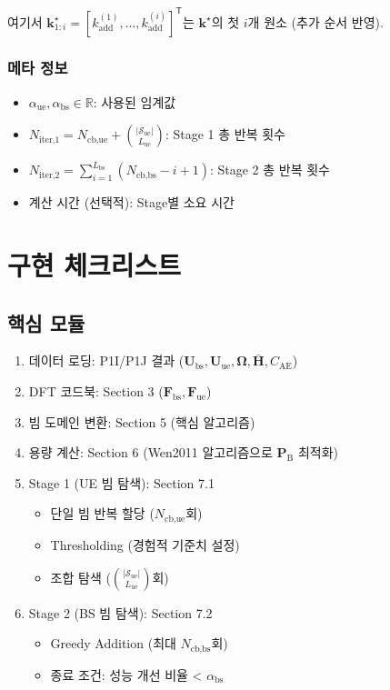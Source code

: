 \documentclass[10pt]{article}
\begin{document}
여기서 $\boldsymbol{k}^{\star}_{1:i} = [k_{\text{add}}^{(1)}, \ldots, k_{\text{add}}^{(i)}]^{\mathsf{T}}$는 $\boldsymbol{k}^{\star}$의 첫 $i$개 원소 (추가 순서 반영).

\subsubsection{메타 정보}
\begin{itemize}
    \item $\alpha_{\text{ue}}, \alpha_{\text{bs}} \in \mathbb{R}$: 사용된 임계값
    \item $N_{\text{iter,1}} = N_{\text{cb,ue}} + \binom{|\mathcal{S}_{\text{ue}}|}{L_{\text{ue}}}$: Stage 1 총 반복 횟수
    \item $N_{\text{iter,2}} = \sum_{i=1}^{L_{\text{bs}}} (N_{\text{cb,bs}} - i + 1)$: Stage 2 총 반복 횟수
    \item 계산 시간 (선택적): Stage별 소요 시간
\end{itemize}


\newpage
\section{구현 체크리스트}

\subsection{핵심 모듈}
\begin{enumerate}
    \item 데이터 로딩: P1I/P1J 결과 ($\mathbf{U}_{\text{bs}}, \mathbf{U}_{\text{ue}}, \boldsymbol{\Omega}, \bar{\mathbf{H}}, C_{\text{AE}}$)
    \item DFT 코드북: Section 3 ($\mathbf{F}_{\text{bs}}, \mathbf{F}_{\text{ue}}$)
    \item 빔 도메인 변환: Section 5 (핵심 알고리즘)
    \item 용량 계산: Section 6 (Wen2011 알고리즘으로 $\mathbf{P}_{\text{B}}$ 최적화)
    \item Stage 1 (UE 빔 탐색): Section 7.1
    \begin{itemize}
        \item 단일 빔 반복 할당 ($N_{\text{cb,ue}}$회)
        \item Thresholding (경험적 기준치 설정)
        \item 조합 탐색 ($\binom{|\mathcal{S}_{\text{ue}}|}{L_{\text{ue}}}$회)
    \end{itemize}
    \item Stage 2 (BS 빔 탐색): Section 7.2
    \begin{itemize}
        \item Greedy Addition (최대 $N_{\text{cb,bs}}$회)
        \item 종료 조건: 성능 개선 비율 < $\alpha_{\text{bs}}$
    \end{itemize}
\end{enumerate}
\end{document}
